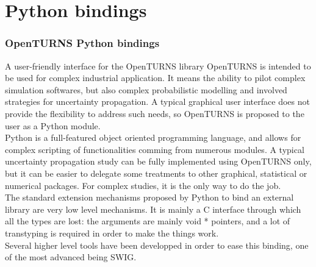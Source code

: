 \documentclass[8pt]{beamer}
\begin{document}
\section[Python bindings]{Python bindings}
\begin{frame}
  \frametitle{OpenTURNS Python bindings}
  \begin{block}{A user-friendly interface for the OpenTURNS library}
    OpenTURNS is intended to be used for complex industrial application. It means the ability to pilot complex simulation softwares, but also complex probabilistic modelling and involved strategies for uncertainty propagation. A typical graphical user interface does not provide the flexibility to address such needs, so OpenTURNS is proposed to the user as a Python module.\\
    Python is a full-featured object oriented programming language, and allows for complex scripting of functionalities comming from numerous modules. A typical uncertainty propagation study can be fully implemented using OpenTURNS only, but it can be easier to delegate some treatments to other graphical, statistical or numerical packages. For complex studies, it is the only way to do the job.\\
    The standard extension mechanisms proposed by Python to bind an external library are very low level mechanisms. It is mainly a C interface through which all the types are lost: the arguments are mainly {\ttfamily void *} pointers, and a lot of transtyping is required in order to make the things work.\\
    Several higher level tools have been developped in order to ease this binding, one of the most advanced being SWIG.
  \end{block}
\end{frame}
\end{document}
